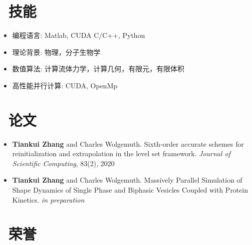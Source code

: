 \documentclass{resume}
\begin{document}

\section{\faCogs\ 技能}
\begin{itemize}[parsep=0.5ex]
  \item 编程语言: Matlab, CUDA C/C++, Python
  \item 理论背景: 物理，分子生物学
  \item 数值算法: 计算流体力学，计算几何，有限元，有限体积
  \item 高性能并行计算: CUDA, OpenMp
\end{itemize}

\section{\faBook\ 论文}
\begin{itemize}[parsep=0.5ex]
  \item \textbf{Tiankui Zhang} and Charles Wolgemuth. Sixth-order accurate schemes for reinitialization and extrapolation in the level set framework. \textit{Journal of Scientific Computing}, 83(2), 2020
  \item \textbf{Tiankui Zhang} and Charles Wolgemuth. Massively Parallel Simulation of Shape Dynamics of Single Phase and Biphasic Vesicles Coupled with Protein Kinetics. \textit{in preparation}
\end{itemize}

\section{\faThumbsUp\ 荣誉}


%
%
\end{document}
